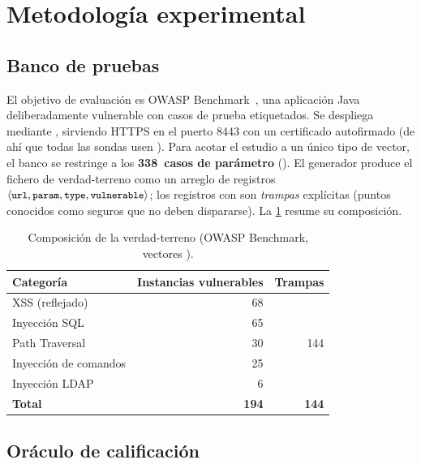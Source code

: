 
\section{Metodología experimental}
\label{sec:metodologia}

\subsection{Banco de pruebas}
\label{sec:testbed}

El objetivo de evaluación es OWASP Benchmark~\cite{owaspbenchmark}, una
aplicación Java deliberadamente vulnerable con casos de prueba etiquetados. Se
despliega mediante , sirviendo HTTPS en el puerto
\num{8443} con un certificado autofirmado (de ahí que todas las sondas usen
). Para acotar el estudio a un único tipo de vector, el
banco se restringe a los \textbf{\num{338}~casos de parámetro }
(). El generador  produce
el fichero de verdad-terreno como un arreglo de registros
$\langle \texttt{\small url}, \texttt{\small param}, \texttt{\small type}, \texttt{\small vulnerable} \rangle$; los
registros con  son \emph{trampas} explícitas (puntos
conocidos como seguros que no deben dispararse). La \cref{tab:testbed} resume
su composición.

\begin{table}[t]
  \centering
  \caption{Composición de la verdad-terreno (OWASP Benchmark, vectores
  ).}
  \label{tab:testbed}
  \begin{tabular}{lrr}
    \toprule
    Categoría & Instancias vulnerables & Trampas \\
    \midrule
    XSS (reflejado)          & 68 & \multirow{5}{*}{144} \\
    Inyección SQL            & 65 & \\
    Path Traversal           & 30 & \\
    Inyección de comandos    & 25 & \\
    Inyección LDAP           & 6  & \\
    \midrule
    \textbf{Total}           & \textbf{194} & \textbf{144} \\
    \bottomrule
  \end{tabular}
\end{table}

\subsection{Oráculo de calificación}
\label{sec:oraculo}

